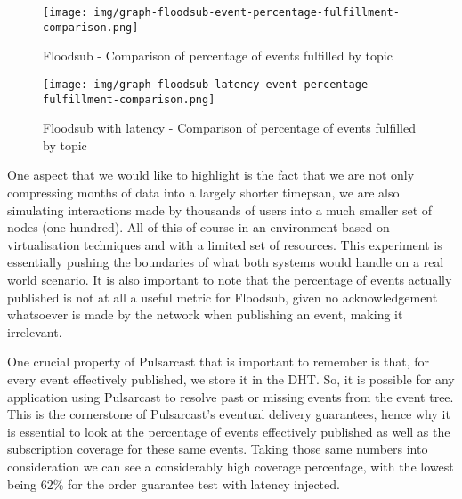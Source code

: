 \begin{figure}[!htb]
  \centering
  \texttt{[image: img/graph-floodsub-event-percentage-fulfillment-comparison.png]}
  \caption{Floodsub - Comparison of percentage of events fulfilled by topic}
  \label{fig:graph-floodsub-event-percentage-fulfillment-comparison}
\end{figure}

\begin{figure}[!htb]
  \centering
  \texttt{[image: img/graph-floodsub-latency-event-percentage-fulfillment-comparison.png]}
  \caption{Floodsub with latency - Comparison of percentage of events fulfilled by topic}
  \label{fig:graph-floodsub-latency-event-percentage-fulfillment-comparison}
\end{figure}

One aspect that we would like to highlight is the fact that we are not only
compressing months of data into a largely shorter timepsan, we are also
simulating interactions made by thousands of users into a much smaller set of
nodes (one hundred). All of this of course in an environment based on
virtualisation techniques and with a limited set of resources. This experiment
is essentially pushing the boundaries of what both systems would handle on a
real world scenario. It is also important to note that the percentage of events
actually published is not at all a useful metric for Floodsub, given no
acknowledgement whatsoever is made by the network when publishing an event,
making it irrelevant.

One crucial property of Pulsarcast that is important to remember is
that, for every event effectively published, we store it in the DHT.
So, it is possible for any application using Pulsarcast to resolve past or
missing events from the event tree. This is the cornerstone of Pulsarcast's
eventual delivery guarantees, hence why it is essential to look at the
percentage of events effectively published as well as the subscription coverage
for these same events. Taking those same numbers into consideration we can see
a considerably high coverage percentage, with the lowest being 62\% for the
order guarantee test with latency injected.
